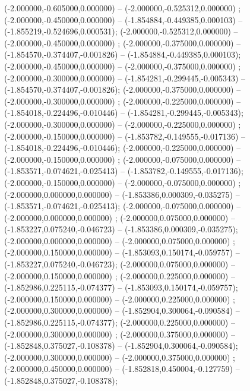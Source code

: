  (-2.000000,-0.605000,0.000000) -- (-2.000000,-0.525312,0.000000) ;
 (-2.000000,-0.450000,0.000000) -- (-1.854884,-0.449385,0.000103) -- (-1.855219,-0.524696,0.000531);
 (-2.000000,-0.525312,0.000000) -- (-2.000000,-0.450000,0.000000) ;
 (-2.000000,-0.375000,0.000000) -- (-1.854570,-0.374407,-0.001826) -- (-1.854884,-0.449385,0.000103);
 (-2.000000,-0.450000,0.000000) -- (-2.000000,-0.375000,0.000000) ;
 (-2.000000,-0.300000,0.000000) -- (-1.854281,-0.299445,-0.005343) -- (-1.854570,-0.374407,-0.001826);
 (-2.000000,-0.375000,0.000000) -- (-2.000000,-0.300000,0.000000) ;
 (-2.000000,-0.225000,0.000000) -- (-1.854018,-0.224496,-0.010446) -- (-1.854281,-0.299445,-0.005343);
 (-2.000000,-0.300000,0.000000) -- (-2.000000,-0.225000,0.000000) ;
 (-2.000000,-0.150000,0.000000) -- (-1.853782,-0.149555,-0.017136) -- (-1.854018,-0.224496,-0.010446);
 (-2.000000,-0.225000,0.000000) -- (-2.000000,-0.150000,0.000000) ;
 (-2.000000,-0.075000,0.000000) -- (-1.853571,-0.074621,-0.025413) -- (-1.853782,-0.149555,-0.017136);
 (-2.000000,-0.150000,0.000000) -- (-2.000000,-0.075000,0.000000) ;
 (-2.000000,0.000000,0.000000) -- (-1.853386,0.000309,-0.035275) -- (-1.853571,-0.074621,-0.025413);
 (-2.000000,-0.075000,0.000000) -- (-2.000000,0.000000,0.000000) ;
 (-2.000000,0.075000,0.000000) -- (-1.853227,0.075240,-0.046723) -- (-1.853386,0.000309,-0.035275);
 (-2.000000,0.000000,0.000000) -- (-2.000000,0.075000,0.000000) ;
 (-2.000000,0.150000,0.000000) -- (-1.853093,0.150174,-0.059757) -- (-1.853227,0.075240,-0.046723);
 (-2.000000,0.075000,0.000000) -- (-2.000000,0.150000,0.000000) ;
 (-2.000000,0.225000,0.000000) -- (-1.852986,0.225115,-0.074377) -- (-1.853093,0.150174,-0.059757);
 (-2.000000,0.150000,0.000000) -- (-2.000000,0.225000,0.000000) ;
 (-2.000000,0.300000,0.000000) -- (-1.852904,0.300064,-0.090584) -- (-1.852986,0.225115,-0.074377);
 (-2.000000,0.225000,0.000000) -- (-2.000000,0.300000,0.000000) ;
 (-2.000000,0.375000,0.000000) -- (-1.852848,0.375027,-0.108378) -- (-1.852904,0.300064,-0.090584);
 (-2.000000,0.300000,0.000000) -- (-2.000000,0.375000,0.000000) ;
 (-2.000000,0.450000,0.000000) -- (-1.852818,0.450004,-0.127759) -- (-1.852848,0.375027,-0.108378);
